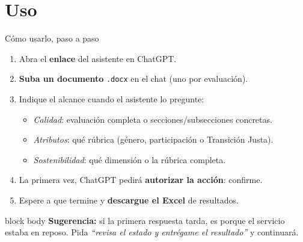 \documentclass[aspectratio=169,11pt]{beamer}
\newcommand{\redlead}[1]{\textbf{\color{iloRed}#1}}
\newcommand{\bluelead}[1]{\textbf{\color{iloBlue}#1}}
\begin{document}
\section{Uso}
\begin{frame}{Cómo usarlo, paso a paso}
  \small
  \begin{enumerate}
    \item Abra el \bluelead{enlace} del asistente en ChatGPT.
    \item \textbf{Suba un documento} \texttt{.docx} en el chat (uno por evaluación).
    \item Indique el alcance cuando el asistente lo pregunte:
      \begin{itemize}
        \item \emph{Calidad}: evaluación completa o secciones/subsecciones concretas.
        \item \emph{Atributos}: qué rúbrica (género, participación o Transición Justa).
        \item \emph{Sostenibilidad}: qué dimensión o la rúbrica completa.
      \end{itemize}
    \item La primera vez, ChatGPT pedirá \bluelead{autorizar la acción}: confirme.
    \item Espere a que termine y \redlead{descargue el Excel} de resultados.
  \end{enumerate}
  \vspace{0.1cm}
  \begin{beamercolorbox}[wd=\textwidth,sep=5pt]{block body}
    \footnotesize \textbf{Sugerencia:} si la primera respuesta tarda, es porque el servicio estaba en reposo. Pida \emph{``revisa el estado y entrégame el resultado''} y continuará.
  \end{beamercolorbox}
\end{frame}
\end{document}
